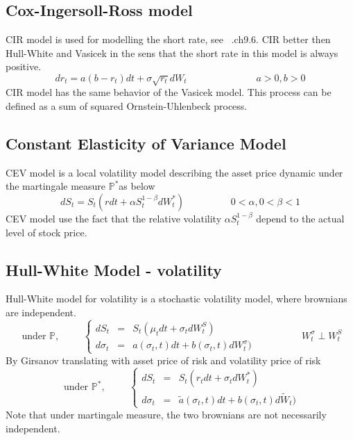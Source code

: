 \documentclass[a4paper,10pt]{article}
\begin{document}
\subsection{Cox-Ingersoll-Ross model}
CIR model is used for modelling the short rate, see ~\cite{ELLIOT}.ch9.6. CIR better then Hull-White and Vasicek in the sens that the short rate in this model is always positive.
\[
dr_t = a (b-r_t) dt +\sigma \sqrt{r_t} dW_t
\hspace{3cm}
a>0,b>0
\]
CIR model has the same behavior of the Vasicek model. This process can be defined as a sum of squared Ornstein-Uhlenbeck process.

\subsection{Constant Elasticity of Variance Model}
CEV model is a local volatility model describing the asset price dynamic under the martingale measure $\mathbb{P}^*$as below
\[
dS_t = S_t ( r dt + \alpha S^{1-\beta}_t d W^*_t )   \hspace{2cm}  0< \alpha,0<\beta<1
\]
CEV model use the fact that the relative volatility $\alpha S^{1-\beta}_t$ depend to the actual level of stock price.

\subsection{Hull-White Model - volatility}
Hull-White model for volatility is a stochastic volatility model, where brownians are independent.
\[
\text{ under }\mathbb{P}, 
\hspace{1cm}
\left\{ 
\begin{array}{rcl}
dS_t    &=& S_t( \mu_t dt + \sigma_t d W^{S}_t )  \\ 
d\sigma_t  &=&  a(\sigma_t,t) dt + b(\sigma_t,t) d {W}^{\sigma}_t )
\end{array}\right. 
\hspace{2cm}
{W}^{\sigma}_t \perp {W}^{S}_t
\]
By Girsanov translating with asset price of risk and volatility price of risk
\[
\text{ under }\mathbb{P}^*, 
\hspace{1cm}
\left\{ 
\begin{array}{rcl}
dS_t    &=& S_t( r_t dt + \sigma_t d W^{*}_t )  \\ 
d\sigma_t  &=&  \widetilde{a}(\sigma_t,t) dt + b(\sigma_t,t) d \widetilde{W}_t )
\end{array}\right. 
\]
Note that under martingale measure, the two brownians are not necessarily independent.
\end{document}

